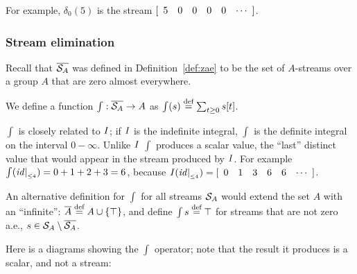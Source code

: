 \begin{center}
\end{center}

For example, $\delta_0(5)$ is the stream $\sv{5 0 0 0 0}$.

\subsubsection{Stream elimination}\label{sec:stream-elimination}

Recall that $\overline{\mathcal{S}_{A}}$ was defined in Definition~\ref{def:zae} to be the set of
$A$-streams over a group $A$ that are zero almost everywhere.

\begin{definition}
We define a function $\int : \overline{\mathcal{S}_{A}} \rightarrow
A$ as $\int(s) \stackrel{\textrm{\scriptsize def}}{=} \sum_{t \geq 0} s[t]$.
\end{definition}

$\int$ is closely related to $\mathit{I}$; if $\mathit{I}$ is the
indefinite integral, $\int$ is the definite integral on the
interval $0 - \infty$.   Unlike $\mathit{I}$
$\int$ produces a scalar value, the ``last'' distinct value that would
appear in the stream produced by $\mathit{I}$.
For example $\int(\mathit{id}|_{_{\leq 4}}) = 0 + 1 + 2 + 3 = 6$, because
$\I(\cut{\id}{4}) = \sv{0 1 3 6 6}$.

An alternative definition for $\int$ for all streams $\mathcal{S}_{A}$
would extend the set $A$ with an ``infinite'':
$\overline{A} \stackrel{\textrm{\scriptsize def}}{=} A \cup \{ \top \}$, and define $\int{s} \stackrel{\textrm{\scriptsize def}}{=}
\top$ for streams that are not zero a.e., $s \in \mathcal{S}_{A} \setminus \overline{\mathcal{S}_{A}}$.

Here is a diagrams showing the $\int$ operator; note that  the result it
produces is a scalar, and not a stream:

\begin{center}
\end{center}

